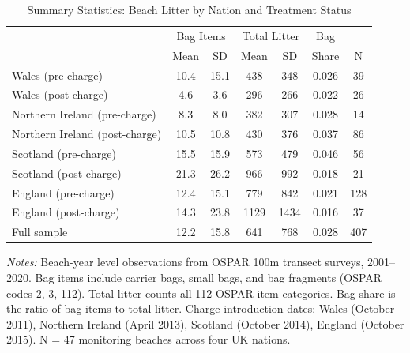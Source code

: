 \begin{table}[htbp]
\centering
\begin{threeparttable}
\caption{Summary Statistics: Beach Litter by Nation and Treatment Status}
\label{tab:sumstats}
\footnotesize
\begin{tabular}{lcccccc}
\toprule
 & \multicolumn{2}{c}{Bag Items} & \multicolumn{2}{c}{Total Litter} & Bag & \\
 & Mean & SD & Mean & SD & Share & N \\
\midrule
\quad Wales (pre-charge) & 10.4 & 15.1 & 438 & 348 & 0.026 & 39 \\
\quad Wales (post-charge) & 4.6 & 3.6 & 296 & 266 & 0.022 & 26 \\
\quad Northern Ireland (pre-charge) & 8.3 & 8.0 & 382 & 307 & 0.028 & 14 \\
\quad Northern Ireland (post-charge) & 10.5 & 10.8 & 430 & 376 & 0.037 & 86 \\
\quad Scotland (pre-charge) & 15.5 & 15.9 & 573 & 479 & 0.046 & 56 \\
\quad Scotland (post-charge) & 21.3 & 26.2 & 966 & 992 & 0.018 & 21 \\
\quad England (pre-charge) & 12.4 & 15.1 & 779 & 842 & 0.021 & 128 \\
\quad England (post-charge) & 14.3 & 23.8 & 1129 & 1434 & 0.016 & 37 \\
\midrule
Full sample & 12.2 & 15.8 & 641 & 768 & 0.028 & 407 \\
\bottomrule
\end{tabular}
\begin{tablenotes}[flushleft]
\small
\item \textit{Notes:} Beach-year level observations from OSPAR 100m transect surveys, 2001--2020. Bag items include carrier bags, small bags, and bag fragments (OSPAR codes 2, 3, 112). Total litter counts all 112 OSPAR item categories. Bag share is the ratio of bag items to total litter. Charge introduction dates: Wales (October 2011), Northern Ireland (April 2013), Scotland (October 2014), England (October 2015). N = 47 monitoring beaches across four UK nations.
\end{tablenotes}
\end{threeparttable}
\end{table}
